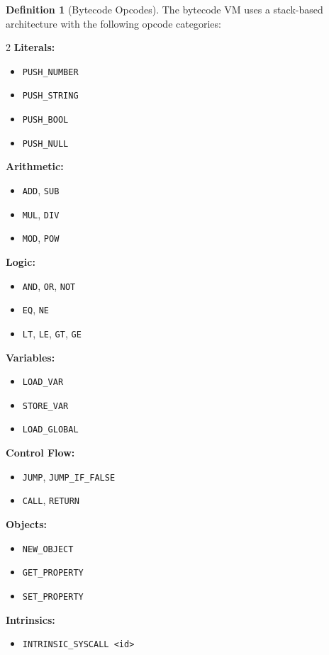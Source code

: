 \documentclass[12pt,a4paper]{article}
\theoremstyle{definition}
\newtheorem{definition}{Definition}[section]
\begin{document}
\begin{definition}[Bytecode Opcodes]
The bytecode VM uses a stack-based architecture with the following opcode categories:

\begin{multicols}{2}
\textbf{Literals:}
\begin{itemize}[noitemsep]
    \item \texttt{PUSH\_NUMBER}
    \item \texttt{PUSH\_STRING}
    \item \texttt{PUSH\_BOOL}
    \item \texttt{PUSH\_NULL}
\end{itemize}

\textbf{Arithmetic:}
\begin{itemize}[noitemsep]
    \item \texttt{ADD}, \texttt{SUB}
    \item \texttt{MUL}, \texttt{DIV}
    \item \texttt{MOD}, \texttt{POW}
\end{itemize}

\textbf{Logic:}
\begin{itemize}[noitemsep]
    \item \texttt{AND}, \texttt{OR}, \texttt{NOT}
    \item \texttt{EQ}, \texttt{NE}
    \item \texttt{LT}, \texttt{LE}, \texttt{GT}, \texttt{GE}
\end{itemize}

\textbf{Variables:}
\begin{itemize}[noitemsep]
    \item \texttt{LOAD\_VAR}
    \item \texttt{STORE\_VAR}
    \item \texttt{LOAD\_GLOBAL}
\end{itemize}

\textbf{Control Flow:}
\begin{itemize}[noitemsep]
    \item \texttt{JUMP}, \texttt{JUMP\_IF\_FALSE}
    \item \texttt{CALL}, \texttt{RETURN}
\end{itemize}

\textbf{Objects:}
\begin{itemize}[noitemsep]
    \item \texttt{NEW\_OBJECT}
    \item \texttt{GET\_PROPERTY}
    \item \texttt{SET\_PROPERTY}
\end{itemize}

\textbf{Intrinsics:}
\begin{itemize}[noitemsep]
    \item \texttt{INTRINSIC\_SYSCALL <id>}
\end{itemize}
\end{multicols}
\end{definition}
\end{document}
